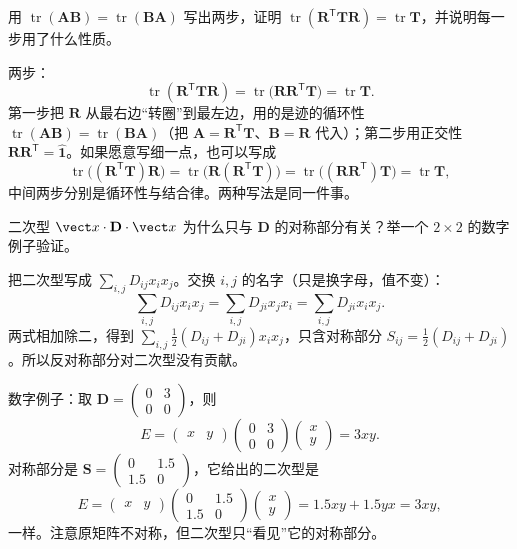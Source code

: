\documentclass[11pt]{ctexart}
\newcommand{\ten}[1]{\mathbf{#1}}
\newcommand{\unitd}{\hat{\ten{1}}}
\newcommand{\tr}{\operatorname{tr}}
\begin{document}
{用 $\tr(\ten A\ten B)=\tr(\ten B\ten A)$ 写出两步，证明 $\tr(\ten R^{\mathsf T}\ten T\ten R)=\tr\ten T$，并说明每一步用了什么性质。}

两步：
\[
\tr(\ten R^{\mathsf T}\ten T\ten R)
=\tr\bigl(\ten R\ten R^{\mathsf T}\ten T\bigr)
=\tr\ten T .
\]
第一步把 $\ten R$ 从最右边“转圈”到最左边，用的是迹的循环性 $\tr(\ten A\ten B)=\tr(\ten B\ten A)$（把 $\ten A=\ten R^{\mathsf T}\ten T$、$\ten B=\ten R$ 代入）；第二步用正交性 $\ten R\ten R^{\mathsf T}=\unitd$。如果愿意写细一点，也可以写成
\[
\tr\bigl((\ten R^{\mathsf T}\ten T)\ten R\bigr)
=\tr\bigl(\ten R(\ten R^{\mathsf T}\ten T)\bigr)
=\tr\bigl((\ten R\ten R^{\mathsf T})\ten T\bigr)
=\tr\ten T,
\]
中间两步分别是循环性与结合律。两种写法是同一件事。

{二次型 $\vect x\cdot\ten D\cdot\vect x$ 为什么只与 $\ten D$ 的对称部分有关？举一个 $2\times2$ 的数字例子验证。}

把二次型写成 $\sum_{i,j}D_{ij}x_ix_j$。交换 $i,j$ 的名字（只是换字母，值不变）：
\[
\sum_{i,j}D_{ij}x_ix_j=\sum_{i,j}D_{ji}x_jx_i=\sum_{i,j}D_{ji}x_ix_j .
\]
两式相加除二，得到 $\sum_{i,j}\tfrac12(D_{ij}+D_{ji})x_ix_j$，只含对称部分 $S_{ij}=\tfrac12(D_{ij}+D_{ji})$。所以反对称部分对二次型没有贡献。

数字例子：取 $\ten D=\begin{pmatrix}0&3\\0&0\end{pmatrix}$，则
\[
E=\begin{pmatrix}x&y\end{pmatrix}\begin{pmatrix}0&3\\0&0\end{pmatrix}\begin{pmatrix}x\\y\end{pmatrix}=3xy .
\]
对称部分是 $\ten S=\begin{pmatrix}0&1.5\\1.5&0\end{pmatrix}$，它给出的二次型是
\[
E=\begin{pmatrix}x&y\end{pmatrix}\begin{pmatrix}0&1.5\\1.5&0\end{pmatrix}\begin{pmatrix}x\\y\end{pmatrix}=1.5xy+1.5yx=3xy,
\]
一样。注意原矩阵不对称，但二次型只“看见”它的对称部分。
\end{document}
